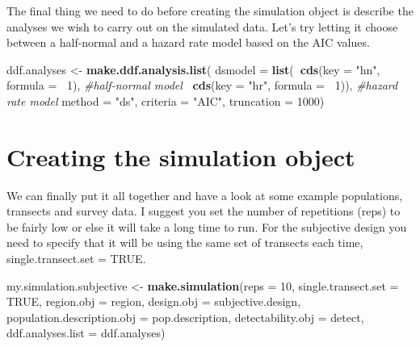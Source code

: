 \documentclass[]{book}
\newenvironment{Shaded}{\begin{snugshade}}{\end{snugshade}}
\newcommand{\KeywordTok}[1]{\textcolor[rgb]{0.13,0.29,0.53}{\textbf{#1}}}
\newcommand{\DataTypeTok}[1]{\textcolor[rgb]{0.13,0.29,0.53}{#1}}
\newcommand{\DecValTok}[1]{\textcolor[rgb]{0.00,0.00,0.81}{#1}}
\newcommand{\StringTok}[1]{\textcolor[rgb]{0.31,0.60,0.02}{#1}}
\newcommand{\CommentTok}[1]{\textcolor[rgb]{0.56,0.35,0.01}{\textit{#1}}}
\newcommand{\OtherTok}[1]{\textcolor[rgb]{0.56,0.35,0.01}{#1}}
\newcommand{\OperatorTok}[1]{\textcolor[rgb]{0.81,0.36,0.00}{\textbf{#1}}}
\newcommand{\NormalTok}[1]{#1}
\theoremstyle{definition}
\theoremstyle{definition}
\theoremstyle{remark}
\begin{document}
The final thing we need to do before creating the simulation object is
describe the analyses we wish to carry out on the simulated data. Let's
try letting it choose between a half-normal and a hazard rate model
based on the AIC values.

\begin{Shaded}
\begin{Highlighting}[]
\NormalTok{ddf.analyses <-}\StringTok{ }\KeywordTok{make.ddf.analysis.list}\NormalTok{(}
                \DataTypeTok{dsmodel =} \KeywordTok{list}\NormalTok{(}\OperatorTok{~}\KeywordTok{cds}\NormalTok{(}\DataTypeTok{key =} \StringTok{"hn"}\NormalTok{, }\DataTypeTok{formula =} \OperatorTok{~}\DecValTok{1}\NormalTok{), }\CommentTok{#half-normal model}
                               \OperatorTok{~}\KeywordTok{cds}\NormalTok{(}\DataTypeTok{key =} \StringTok{"hr"}\NormalTok{, }\DataTypeTok{formula =} \OperatorTok{~}\DecValTok{1}\NormalTok{)),  }\CommentTok{#hazard rate model}
                \DataTypeTok{method =} \StringTok{"ds"}\NormalTok{, }\DataTypeTok{criteria =} \StringTok{"AIC"}\NormalTok{, }\DataTypeTok{truncation =} \DecValTok{1000}\NormalTok{)}
\end{Highlighting}
\end{Shaded}

\section{Creating the simulation
object}\label{creating-the-simulation-object}

We can finally put it all together and have a look at some example
populations, transects and survey data. I suggest you set the number of
repetitions (reps) to be fairly low or else it will take a long time to
run. For the subjective design you need to specify that it will be using
the same set of transects each time, single.transect.set = TRUE.

\begin{Shaded}
\begin{Highlighting}[]
\NormalTok{my.simulation.subjective <-}\StringTok{ }\KeywordTok{make.simulation}\NormalTok{(}\DataTypeTok{reps =} \DecValTok{10}\NormalTok{, }
                                            \DataTypeTok{single.transect.set =} \OtherTok{TRUE}\NormalTok{, }
                                            \DataTypeTok{region.obj =}\NormalTok{ region, }
                                            \DataTypeTok{design.obj =}\NormalTok{ subjective.design, }
                                            \DataTypeTok{population.description.obj =}\NormalTok{ pop.description,}
                                            \DataTypeTok{detectability.obj =}\NormalTok{ detect, }
                                            \DataTypeTok{ddf.analyses.list =}\NormalTok{ ddf.analyses)}
\end{Highlighting}
\end{Shaded}
\end{document}

